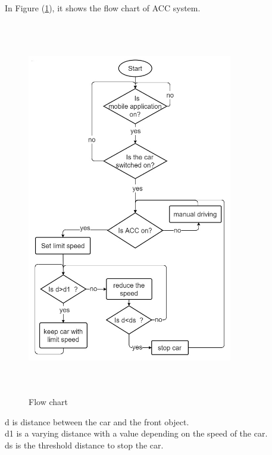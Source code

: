 \documentclass[12pt,a4paper]{report}
\begin{document}
\subsection{\fontsize{12}{12}\selectfont{ACC flow chart:}}
In Figure (\ref{fig:ACC flow chart}), it shows the flow chart of ACC system.
\begin{figure}[H]
    \centering
    \graphicspath{ {./images/} }
    \includegraphics[width=0.8\textwidth,height=16.5cm]{ACC flow chart.jpg}
    \caption{Flow chart}
    \label{fig:ACC flow chart}
\end{figure}
d is distance between the car and the front object.\\
d1 is a varying distance with a value depending on the speed of the car.\\
ds is the threshold distance to stop the car.\\


\end{document}
